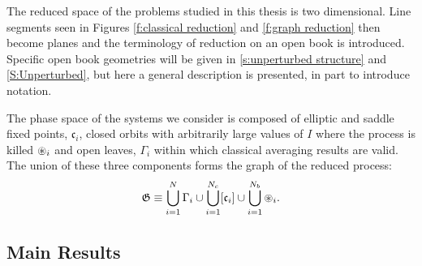 The reduced space of the problems studied in this thesis is two dimensional. Line segments seen in Figures \ref{f:classical reduction} and \ref{f:graph reduction} then become planes and the terminology of reduction on an open book \cite{freidlin04:_diffus} is introduced. Specific open book geometries will be given in \ref{s:unperturbed structure} and \ref{S:Unperturbed}, but here a general description is presented, in part to introduce notation.

The phase space of the systems we consider is composed  of elliptic and saddle fixed points, $\mathfrak{c}_i$, closed orbits with arbitrarily large values of $I$ where the process is killed $\circledast_i$ and open leaves, $\Gamma_i$ within which classical averaging results are valid. The union of these three components forms the graph of the reduced process:
\[
\mathfrak G \equiv \bigcup_{i=1}^{N} \Gamma_i \cup \bigcup_{i=1}^{N_c}
[\mathfrak{c}_i] \cup \bigcup_{i=1}^{N_b}\circledast_i.
\]

\subsection{Main Results}

